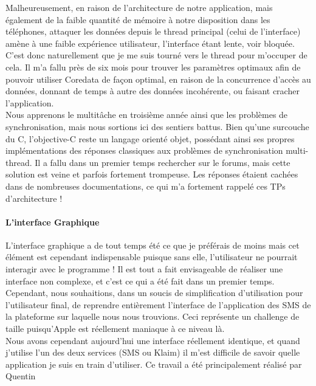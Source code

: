 \documentclass{article}
\begin{document}
		Malheureusement, en raison de l'architecture de notre application, mais également de la faible quantité de mémoire à notre disposition dans les téléphones, attaquer les données depuis le thread principal (celui de l'interface) amène à une faible expérience utilisateur, l'interface étant lente, voir bloquée. C'est donc naturellement que je me suis tourné vers le thread pour m'occuper de cela. Il m'a fallu près de six mois pour trouver les paramètres optimaux afin de pouvoir utiliser Coredata de façon optimal, en raison de la concurrence d'accès au données, donnant de temps à autre des données incohérente, ou faisant cracher l'application.\\
		
		Nous apprenons le multitâche en troisième année ainsi que les problèmes de synchronisation, mais nous sortions ici des sentiers battus. Bien qu'une surcouche du C, l'objective-C reste un langage orienté objet, possédant ainsi ses propres implémentations  des réponses classiques aux problèmes de synchronisation multi-thread. Il a fallu dans un premier temps rechercher sur le forums, mais cette solution est veine et parfois fortement trompeuse. Les réponses étaient cachées dans de nombreuses documentations, ce qui m'a fortement rappelé ces TPs d'architecture !\\
		
		\paragraph{L'interface Graphique}
		L'interface graphique a de tout temps été ce que je préférais de moins mais cet élément est cependant indispensable puisque sans elle, l'utilisateur ne pourrait interagir avec le programme ! Il est tout a fait envisageable de réaliser une interface non complexe, et c'est ce qui a été fait dans un premier temps. Cependant, nous souhaitions, dans un soucis de simplification d'utilisation pour l'utilisateur final, de reprendre entièrement l'interface de l'application des SMS de la plateforme sur laquelle nous nous trouvions. Ceci représente un challenge de taille puisqu'Apple est réellement maniaque à ce niveau là. \\
		
		Nous avons cependant aujourd'hui une interface réellement identique, et quand j'utilise l'un des deux services (SMS ou Klaim) il m'est difficile de savoir quelle application je suis en train d'utiliser. Ce travail a été principalement réalisé par Quentin\\
		
\end{document}
